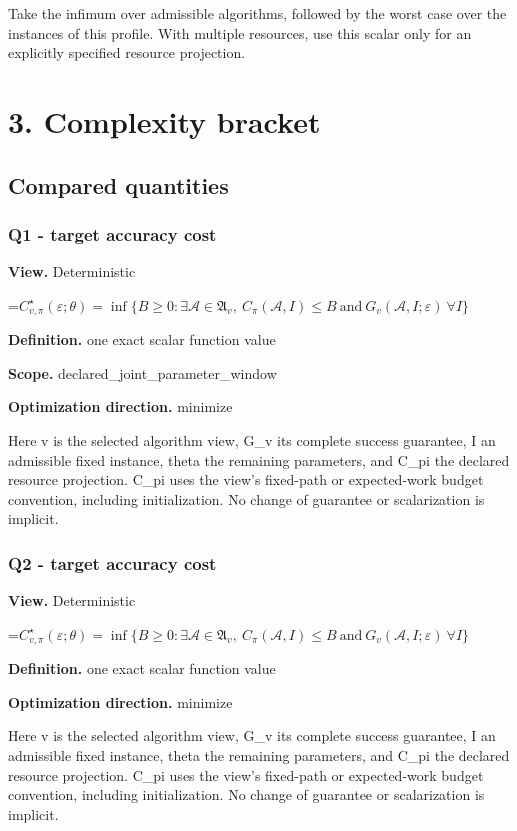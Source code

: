 \documentclass[10pt,a4paper]{article}
\newcommand{\AtlasMath}[1]{\par\begingroup\centering\setbox0=\hbox{$\displaystyle #1$}\ifdim\wd0>1.4\linewidth\typeout{ATLAS WIDE FORMULA: \the\wd0}\fi\ifdim\wd0>\linewidth\resizebox{\linewidth}{!}{\box0}\else\box0\fi\par\endgroup}
\begin{document}
Take the infimum over admissible algorithms, followed by the worst case over the instances of this profile. With multiple resources, use this scalar only for an explicitly specified resource projection.

\section{3. Complexity bracket}
\subsection{Compared quantities}
\subsubsection{Q1 - target accuracy cost}
\textbf{View.} Deterministic

\AtlasMath{C^\star_{v,\pi}(\varepsilon;\theta)=\inf\{B\ge0:\exists\mathcal A\in\mathfrak A_v,\ C_\pi(\mathcal A,I)\le B\ \text{and}\ G_v(\mathcal A,I;\varepsilon)\ \forall I\}}
\textbf{Definition.} one exact scalar function value

\textbf{Scope.} declared\_\allowbreak{}joint\_\allowbreak{}parameter\_\allowbreak{}window

\textbf{Optimization direction.} minimize

Here v is the selected algorithm view, G\_\allowbreak{}v its complete success guarantee, I an admissible fixed instance, theta the remaining parameters, and C\_\allowbreak{}pi the declared resource projection. C\_\allowbreak{}pi uses the view's fixed-path or expected-work budget convention, including initialization. No change of guarantee or scalarization is implicit.

\subsubsection{Q2 - target accuracy cost}
\textbf{View.} Deterministic

\AtlasMath{C^\star_{v,\pi}(\varepsilon;\theta)=\inf\{B\ge0:\exists\mathcal A\in\mathfrak A_v,\ C_\pi(\mathcal A,I)\le B\ \text{and}\ G_v(\mathcal A,I;\varepsilon)\ \forall I\}}
\textbf{Definition.} one exact scalar function value

\textbf{Optimization direction.} minimize

Here v is the selected algorithm view, G\_\allowbreak{}v its complete success guarantee, I an admissible fixed instance, theta the remaining parameters, and C\_\allowbreak{}pi the declared resource projection. C\_\allowbreak{}pi uses the view's fixed-path or expected-work budget convention, including initialization. No change of guarantee or scalarization is implicit.
\end{document}
